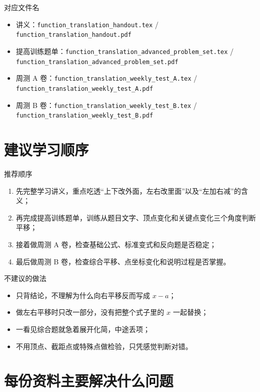 \documentclass[11pt,a4paper,fontset=fandol]{ctexart}
\begin{document}
\begin{infobox}{对应文件名}
\begin{itemize}
  \item 讲义：\texttt{function\_translation\_handout.tex} / \texttt{function\_translation\_handout.pdf}
  \item 提高训练题单：\texttt{function\_translation\_advanced\_problem\_set.tex} / \texttt{function\_translation\_advanced\_problem\_set.pdf}
  \item 周测 A 卷：\texttt{function\_translation\_weekly\_test\_A.tex} / \texttt{function\_translation\_weekly\_test\_A.pdf}
  \item 周测 B 卷：\texttt{function\_translation\_weekly\_test\_B.tex} / \texttt{function\_translation\_weekly\_test\_B.pdf}
\end{itemize}
\end{infobox}

\section{建议学习顺序}

\begin{goalbox}{推荐顺序}
\begin{enumerate}
  \item 先完整学习讲义，重点吃透“上下改外面，左右改里面”以及“左加右减”的含义；
  \item 再完成提高训练题单，训练从题目文字、顶点变化和关键点变化三个角度判断平移；
  \item 接着做周测 A 卷，检查基础公式、标准变式和反向题是否稳定；
  \item 最后做周测 B 卷，检查综合平移、点坐标变化和说明过程是否掌握。
\end{enumerate}
\end{goalbox}

\begin{warnbox}{不建议的做法}
\begin{itemize}
  \item 只背结论，不理解为什么向右平移反而写成 $x-a$；
  \item 做左右平移时只改一部分，没有把整个式子里的 $x$ 一起替换；
  \item 一看见综合题就急着展开化简，中途丢项；
  \item 不用顶点、截距点或特殊点做检验，只凭感觉判断对错。
\end{itemize}
\end{warnbox}

\section{每份资料主要解决什么问题}
\end{document}
